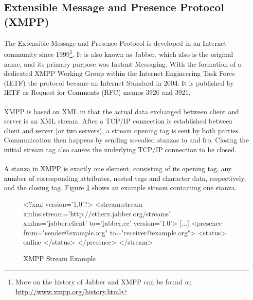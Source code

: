 \subsection{Extensible Message and Presence Protocol (XMPP)}
\label{sec:xmpp}
\paragraph{}
The Extensible Message and Presence Protocol is developed in an Internet community since 1999\footnote{More on the history of Jabber and XMPP can be found on \href{http://www.xmpp.org/history.html}{http://www.xmpp.org/history.html}}. It is also known as Jabber, which also is the original name, and its primary purpose was Instant Messaging. With the formation of a dedicated XMPP Working Group within the Internet Engineering Task Force (IETF) the protocol became an Internet Standard in 2004. It is published by IETF as Request for Comments (RFC) memos 3920 and 3921.
\paragraph{}
XMPP is based on XML in that the actual data exchanged between client and server is an XML stream. After a TCP/IP connection is established between client and server (or two servers), a stream opening tag is sent by both parties. Communication then happens by sending so-called stanzas to and fro. Closing the initial stream tag also causes the underlying TCP/IP connection to be closed.
\paragraph{}
A stanza in XMPP is exactly one element, consisting of its opening tag, any number of corresponding attributes, nested tags and character data, respectively, and the closing tag. Figure \ref{fig:streamExample} shows an example stream containing one stanza.

\begin{figure}[H]
\begin{listing}{1}
<?xml version='1.0'?>
<stream:stream 
      xmlns:stream='http://etherx.jabber.org/streams' 
      xmlns='jabber:client' to='jabber.cc' version='1.0'>
[...]
  <presence from="sender@example.org"
        to="receiver@example.org">
    <status>
      online
    </status>
  </presence>
</stream>
\end{listing}
\caption{XMPP Stream Example}
\label{fig:streamExample}
\end{figure}


